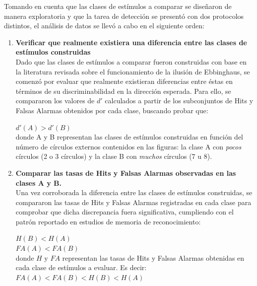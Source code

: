 Tomando en cuenta que las clases de estímulos a comparar se diseñaron de manera exploratoria y que la tarea de detección se presentó con dos protocolos distintos, el análisis de datos se llevó a cabo en el siguiente orden:\\

\begin{enumerate}
\item \textbf{Verificar que realmente existiera una diferencia entre las clases de estímulos construidas}\\

Dado que las clases de estímulos a comparar fueron construidas con base en la literatura revisada sobre el funcionamiento de la ilusión de Ebbinghaus, se comenzó por evaluar que realmente existieran diferencias entre éstas en términos de su discriminabilidad en la dirección esperada. Para ello, se compararon los valores de $d'$ calculados a partir de los subconjuntos de Hits y Falsas Alarmas obtenidos por cada clase, buscando probar que:

\begin{center}
 $d'(A) > d'(B)$\\
 donde A y B representan las clases de estímulos construidas en función del número de círculos externos contenidos en las figuras: la clase A con \textit{pocos} círculos (2 o 3 círculos) y la clase B con \textit{muchos} círculos (7 u 8).\\
\end{center}


\item \textbf{Comparar las tasas de Hits y Falsas Alarmas observadas en las clases A y B.}\\

Una vez corroborada la diferencia entre las clases de estímulos construidas, se compararon las tasas de Hits y Falsas Alarmas registradas en cada clase para comprobar que dicha discrepancia fuera significativa, cumpliendo con el patrón reportado en estudios de memoria de reconocimiento:

\begin{center}
$H(B) < H(A)$\\
$FA(A) < FA(B)$\\
donde $H$ y $FA$ representan las tasas de Hits y Falsas Alarmas obtenidas en cada clase de estímulos a evaluar. Es decir:\\
$FA(A) < FA(B) < H(B) < H(A)$\\
\end{center}


\end{enumerate}
